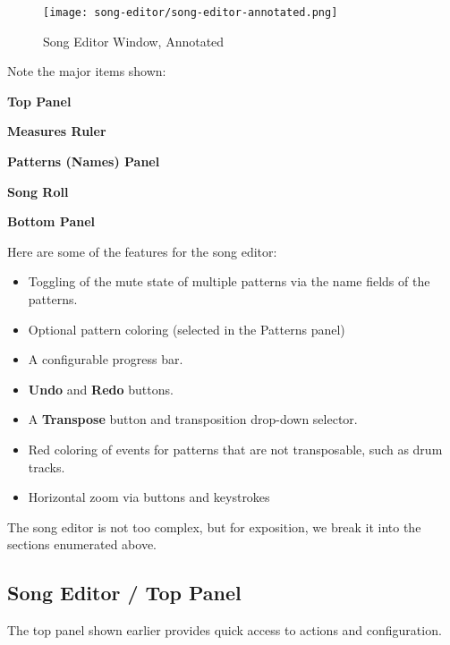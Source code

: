 \begin{figure}[H]
   \centering 
   \texttt{[image: song-editor/song-editor-annotated.png]}
   \caption{Song Editor Window, Annotated}
   \label{fig:song_editor_window_annotated}
\end{figure}

   Note the major items shown:

   \begin{enumber}
      \item \textbf{Top Panel}
      \item \textbf{Measures Ruler}
      \item \textbf{Patterns (Names) Panel}
      \item \textbf{Song Roll}
      \item \textbf{Bottom Panel}
   \end{enumber}

   Here are some of the features for the song editor:

   \begin{itemize}
      \item Toggling of the mute state of multiple patterns
         via the name fields of the patterns.
      \item Optional pattern coloring (selected in the Patterns panel)
      \item A configurable progress bar.
      \item \textbf{Undo} and \textbf{Redo} buttons.
      \item A \textbf{Transpose} button and transposition drop-down selector.
      \item Red coloring of events for patterns that are not transposable, such
         as drum tracks.
      \item Horizontal zoom via buttons and keystrokes
   \end{itemize}

   The song editor is not too complex, but for exposition, we break it into
   the sections enumerated above.

\subsection{Song Editor / Top Panel}
\label{subsec:song_editor_top}

   The top panel shown earlier provides quick access to actions
   and configuration.

